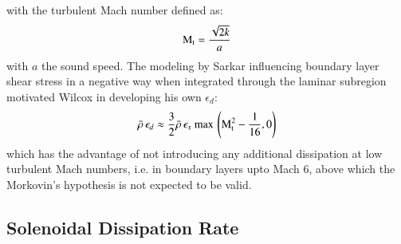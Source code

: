 \documentclass{warpdoc}
\newcommand{\turb}{_{\rm t}}
\begin{document}
%
with the turbulent Mach number defined as:
%
\begin{equation}
 {\rm M}\turb = \frac{\sqrt{2 k}}{a}
 \label{eqn:Mturb}
\end{equation}
%
with $a$ the sound speed. The modeling by Sarkar influencing boundary layer shear stress
in a negative way when integrated through the laminar subregion motivated Wilcox\cite{turb:wilcoxcomp}
in developing his own $\epsilon_d$:
%
\begin{equation}
 \wbar{\rho}\, \epsilon_d \approx 
    \frac{3}{2} \wbar{\rho}\, \epsilon_s
       {\rm  ~max\,}\left( {\rm M}\turb^2 - \frac{1}{16} ,  0 \right)
 \label{eqn:DDR:modeled:wilcox}
\end{equation}
%
which has the advantage of not introducing any additional dissipation at low
turbulent Mach numbers, i.e. in boundary layers upto Mach 6, above which
the Morkovin's hypothesis is not expected to be valid.





\subsection{Solenoidal Dissipation Rate}
\end{document}

